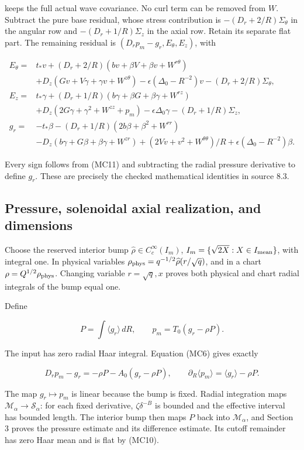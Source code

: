 \documentclass[10pt,a4paper]{article}
\begin{document}
keeps the full actual wave covariance. No curl term can be removed from \(W\). Subtract the pure base residual, whose stress contribution is \(-(D_r+2/R)\Sigma_\theta\) in the angular row and \(-(D_r+1/R)\Sigma_z\) in the axial row. Retain its separate flat part. The remaining residual is \((D_rp_m-g_r,E_\theta,E_z)\), with

\[
\begin{aligned}
E_\theta={}&t_*v+(D_r+2/R)(bv+\beta V+\beta v+W^{r\theta})\\
&+D_z(Gv+V\gamma+\gamma v+W^{z\theta})
-\epsilon(\Delta_0-R^{-2})v-(D_r+2/R)\Sigma_\theta,\\
E_z={}&t_*\gamma+(D_r+1/R)(b\gamma+\beta G+\beta\gamma+W^{rz})\\
&+D_z(2G\gamma+\gamma^2+W^{zz}+p_m)
-\epsilon\Delta_0\gamma-(D_r+1/R)\Sigma_z,\\
g_r={}&-t_*\beta-(D_r+1/R)(2b\beta+\beta^2+W^{rr})\\
&-D_z(b\gamma+G\beta+\beta\gamma+W^{zr})
+(2Vv+v^2+W^{\theta\theta})/R
+\epsilon(\Delta_0-R^{-2})\beta.
\end{aligned}
\tag{MC12}
\]

Every sign follows from (MC11) and subtracting the radial pressure derivative to define \(g_r\). These are precisely the checked mathematical identities in source \(8.3\).

\subsection{Pressure, solenoidal axial realization, and dimensions}

Choose the reserved interior bump \(\widehat\rho\in C_c^\infty(I_m)\), \(I_m=\{\sqrt{2X}:X\in I_{\rm mean}\}\), with integral one. In physical variables \(\rho_{\rm phys}=q^{-1/2}\widehat\rho(r/\sqrt q)\), and in a chart \(\rho=Q^{1/2}\rho_{\rm phys}\). Changing variable \(r=\sqrt q,x\) proves both physical and chart radial integrals of the bump equal one.

Define

\[
P=\int\langle g_r\rangle\,dR,\qquad p_m=T_0(g_r-\rho P).
\]

The input has zero radial Haar integral. Equation (MC6) gives exactly

\[
D_rp_m-g_r=-\rho P-A_0(g_r-\rho P),
\qquad
\partial_R\langle p_m\rangle=\langle g_r\rangle-\rho P.
\tag{MC13}
\]

The map \(g_r\mapsto p_m\) is linear because the bump is fixed. Radial integration maps \(\mathcal M_\alpha\to\mathcal S_\alpha\): for each fixed derivative, \(\zeta\delta^{-B}\) is bounded and the effective interval has bounded length. The interior bump then maps \(P\) back into \(\mathcal M_\alpha\), and Section 3 proves the pressure estimate and its difference estimate. Its cutoff remainder has zero Haar mean and is flat by (MC10).
\end{document}
